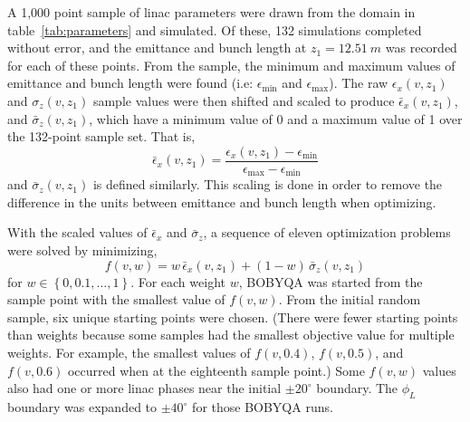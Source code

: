 \documentclass{iitthesis}
\begin{document}
A 1,000 point sample of linac parameters were drawn from the domain
in table~\ref{tab:parameters} and simulated. Of these, 132 simulations completed
without error, and the emittance and bunch length at $z_1=\SI{12.51}{m}$ was
recorded for each of these points. From the sample, the minimum and maximum values of emittance and bunch length
were found (i.e: $\epsilon_{\min}$ and $\epsilon_{\max}$). 
The raw $\epsilon_x(v,z_1)$ and $\sigma_z(v,z_1)$ sample values were then
shifted and scaled to produce $\bar{\epsilon}_x(v,z_1)$, and $\bar{\sigma}_z(v,z_1)$,
which have a minimum value of 0 and a maximum value of 1 over the 132-point sample set. That is, 
\begin{equation}
\bar{\epsilon}_x (v,z_1) = \frac{ \epsilon_x (v,z_1) - \epsilon_{\min} } { \epsilon_{\max} - \epsilon_{\min} }
\label{eq:scale}
\end{equation} 
and $\bar{\sigma}_z (v,z_1)$ is defined similarly.
This scaling is done in order to remove the difference in the units between
emittance and bunch length when optimizing.

With the scaled values of $\bar{\epsilon}_x$ and $\bar{\sigma}_z$, a sequence
of eleven optimization problems were solved by minimizing,
\begin{equation}
f(v,w) = w \,\bar{\epsilon}_x(v,z_1) + (1-w)\, \bar{\sigma}_z(v,z_1)
\label{eq:newobj}
\end{equation}
for $w \in \left\{ 0, 0.1, \ldots, 1 \right\}$. 
For each weight $w$, BOBYQA was started from the sample point with the 
smallest value of $f(v,w)$.  From the initial random sample, six unique starting points were chosen. 
(There were fewer starting points than weights because some samples had the smallest objective value for multiple weights. 
For example, the smallest values of $f(v,0.4)$, $f(v,0.5)$, and $f(v,0.6)$ occurred when at the eighteenth sample point.)
Some $f(v,w)$ values also had one or more linac phases near the initial $\pm20^{\circ}$ boundary. 
The $\phi_L$ boundary was expanded to $\pm40^{\circ}$ for those BOBYQA runs.
\end{document}
